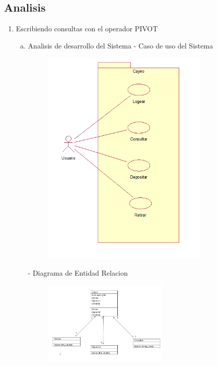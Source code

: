 \subsection{Analisis}
\begin{enumerate}[1.]
	\item Escribiendo consultas con el operador PIVOT
	\begin{enumerate}[a)]
	\item Analisis de desarrollo del Sistema
		-  Caso de uso del Sistema\\
		\begin{figure}[H]
		\begin{center}
		\includegraphics[width=8cm]{./Imagenes/cus}
		\end{center}
		\end{figure}
		-  Diagrama de Entidad Relacion
		\begin{figure}[H]
		\begin{center}
		\includegraphics[width=6cm]{./Imagenes/img1}
		\end{center}
		\end{figure}
	\end{enumerate}
\end{enumerate}

